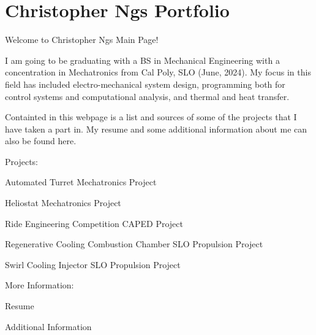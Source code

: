 \chapter{Christopher Ng\textquotesingle{}s Portfolio}
\hypertarget{index}{}\label{index}
Welcome to Christopher Ng\textquotesingle{}s Main Page!

I am going to be graduating with a BS in Mechanical Engineering with a concentration in Mechatronics from Cal Poly, SLO (June, 2024). My focus in this field has included electro-\/mechanical system design, programming both for control systems and computational analysis, and thermal and heat transfer.

Containted in this webpage is a list and sources of some of the projects that I have taken a part in. My resume and some additional information about me can also be found here.

Projects\+:
\begin{DoxyItemize}
\item {}
\item Automated Turret Mechatronics Project
\item Heliostat Mechatronics Project
\item Ride Engineering Competition CAPED Project
\item Regenerative Cooling Combustion Chamber SLO Propulsion Project
\item Swirl Cooling Injector SLO Propulsion Project
\end{DoxyItemize}

More Information\+:
\begin{DoxyItemize}
\item Resume
\item Additional Information 
\end{DoxyItemize}
